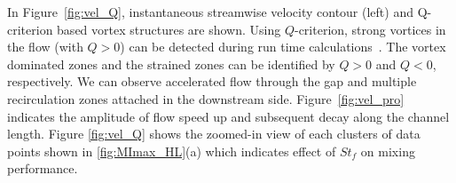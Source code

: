 \documentclass[%
 aip,
 amsmath,amssymb,
 reprint,
]{revtex4-1}
\begin{document}
\onecolumngrid
In Figure~\ref{fig:vel_Q}, instantaneous streamwise velocity contour (left) and Q-criterion based vortex structures are shown. Using $Q$-criterion, strong vortices in the flow (with $Q>0$) can be detected during run time calculations~\cite{Hunt1994, Hussain1995, Holmes2012, Rowley2014}. The vortex dominated zones and the strained zones can be identified by $Q>0$ and $Q<0$, respectively. We can observe accelerated flow through the gap and multiple recirculation zones attached in the downstream side. Figure~\ref{fig:vel_pro} indicates the amplitude of flow speed up and subsequent decay along the channel length. Figure \ref{fig:vel_Q} shows the zoomed-in view of each clusters of data points shown in \ref{fig:MImax_HL}(a) which indicates effect of $St_f$ on mixing performance.
\end{document}
